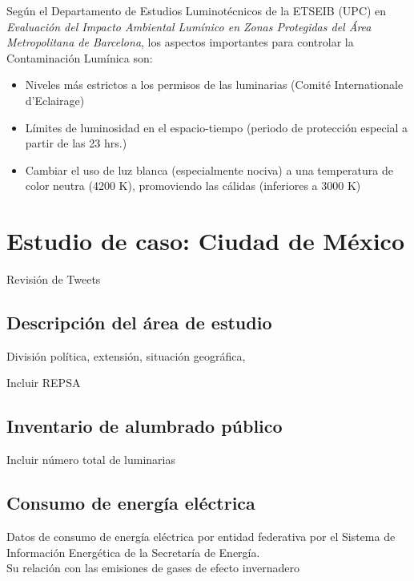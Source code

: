 Según el Departamento de Estudios Luminotécnicos de la ETSEIB (UPC) en \textit{Evaluación del Impacto Ambiental Lumínico en Zonas Protegidas del Área Metropolitana de Barcelona}, los aspectos importantes para controlar la Contaminación Lumínica son:

\begin{itemize}
    \item Niveles más estrictos a los permisos de las luminarias (Comité Internationale d'Eclairage)
    
    \item Límites de luminosidad en el espacio-tiempo (periodo de protección especial a partir de las 23 hrs.)
    
     \item Cambiar el uso de luz blanca (especialmente nociva) a una temperatura de color neutra (4200 K), promoviendo las cálidas (inferiores a 3000 K)
     
\end{itemize}


\section{Estudio de caso: Ciudad de México}

Revisión de Tweets

\subsection{Descripción del área de estudio}

División política, extensión, situación geográfica, 

Incluir REPSA

\subsection{Inventario de alumbrado público}

Incluir número total de luminarias

\subsection{Consumo de energía eléctrica}

Datos de consumo de energía eléctrica por entidad federativa por el Sistema de Información Energética de la Secretaría de Energía.\\

Su relación con las emisiones de gases de efecto invernadero 

